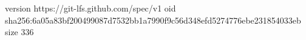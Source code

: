 version https://git-lfs.github.com/spec/v1
oid sha256:6a05a83bf200499087d7532bb1a7990f9c56d348efd5274776ebe231854033eb
size 336
